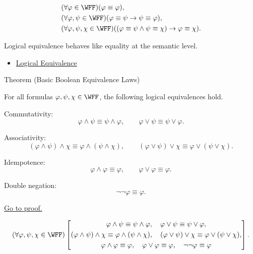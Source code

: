 \begin{remark*}
\[
\begin{aligned}
&(\forall\varphi\in\WFF)(\varphi\equiv\varphi),\\
&(\forall\varphi,\psi\in\WFF)(\varphi\equiv\psi\to\psi\equiv\varphi),\\
&(\forall\varphi,\psi,\chi\in\WFF)
((\varphi\equiv\psi\land\psi\equiv\chi)\to\varphi\equiv\chi).
\end{aligned}
\]
\end{remark*}

\begin{remark*}[Interpretation]
Logical equivalence behaves like equality at the semantic level.
\end{remark*}

\begin{dependencies}
\begin{itemize}
  \item \hyperref[def:logical-equivalence-propositional-logic]{Logical Equivalence}
\end{itemize}
\end{dependencies}
\begin{theorembox}{Theorem (Basic Boolean Equivalence Laws)}
\begin{theorem}
\label{thm:basic-boolean-equivalence-laws-propositional-logic}
For all formulas \(\varphi,\psi,\chi\in\WFF\), the following logical equivalences hold.

Commutativity:
\[
\varphi\land\psi\equiv\psi\land\varphi,
\qquad
\varphi\lor\psi\equiv\psi\lor\varphi.
\]

Associativity:
\[
(\varphi\land\psi)\land\chi
\equiv
\varphi\land(\psi\land\chi),
\qquad
(\varphi\lor\psi)\lor\chi
\equiv
\varphi\lor(\psi\lor\chi).
\]

Idempotence:
\[
\varphi\land\varphi\equiv\varphi,
\qquad
\varphi\lor\varphi\equiv\varphi.
\]

Double negation:
\[
\neg\neg\varphi\equiv\varphi.
\]

\noindent\hyperref[prf:basic-boolean-equivalence-laws-propositional-logic]{Go to proof.}
\end{theorem}
\end{theorembox}

\begin{remark*}
\[
(\forall\varphi,\psi,\chi\in\WFF)
\left[
\begin{gathered}
\varphi\land\psi\equiv\psi\land\varphi,\quad
\varphi\lor\psi\equiv\psi\lor\varphi,\\
(\varphi\land\psi)\land\chi\equiv\varphi\land(\psi\land\chi),\quad
(\varphi\lor\psi)\lor\chi\equiv\varphi\lor(\psi\lor\chi),\\
\varphi\land\varphi\equiv\varphi,\quad
\varphi\lor\varphi\equiv\varphi,\quad
\neg\neg\varphi\equiv\varphi
\end{gathered}
\right].
\]
\end{remark*}

